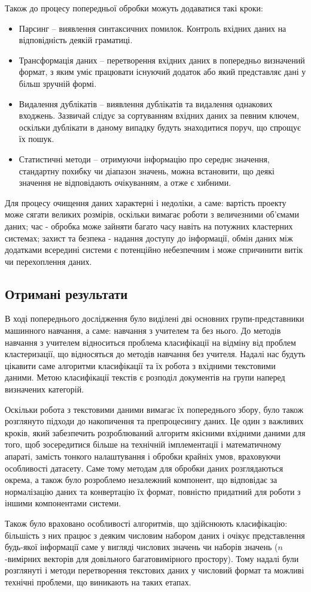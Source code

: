 Також до процесу попередньої обробки можуть додаватися такі кроки:
\begin{itemize}
	\item Парсинг – виявлення синтаксичних помилок. Контроль вхідних даних на відповідність деякій граматиці.
	\item Трансформація даних – перетворення вхідних даних в попередньо визначений формат, з яким уміє працювати існуючий додаток або який представляє дані у більш зручній формі.
	\item Видалення дублікатів – виявлення дублікатів та видалення однакових входжень. Зазвичай слідує за сортуванням вхідних даних за певним ключем, оскільки дублікати в даному випадку будуть знаходитися поруч, що спрощує їх пошук.
	\item Статистичні методи – отримуючи інформацію про середнє значення, стандартну похибку чи діапазон значень, можна встановити, що деякі значення не відповідають очікуванням, а отже є хибними.
\end{itemize}

Для процесу очищення даних характерні і недоліки, а саме: вартість проекту може сягати великих розмірів, оскільки вимагає роботи з величезними об'ємами даних; час - обробка може зайняти багато часу навіть на потужних кластерних системах; захист та безпека - надання доступу до інформації, обмін даних між додатками всередині системи є потенційно небезпечним і може спричинити витік чи перехоплення даних.

\subsection{Отримані результати}
В ході попереднього дослідження було виділені дві основних групи-представники машинного навчання, а саме: навчання з учителем та без нього. До методів навчання з учителем відноситься проблема класифікації на відміну від проблем кластеризації, що відносяться до методів навчання без учителя. Надалі нас будуть цікавити саме алгоритми класифікації та їх робота з вхідними текстовими даними. Метою класифікації текстів є розподіл документів на групи наперед визначених категорій.

Оскільки робота з текстовими даними вимагає їх попереднього збору, було також розглянуто підходи до накопичення та препроцесингу даних. Це один з важливих кроків, який забезпечить розроблюваний алгоритм якісними вхідними даними для того, щоб зосередитися більше на технічній імплементації і математичному апараті, замість тонкого налаштування і обробки крайніх умов, враховуючи особливості датасету. Саме тому методам для обробки даних розглядаються окрема, а також було розроблемо незалежний компонент, що відповідає за нормалізацію даних та конвертацію їх формат, повністю придатний для роботи з іншими компонентами системи.

Також було враховано особливості алгоритмів, що здійснюють класифікацію: більшість з них працює з деяким числовим набором даних і очікує представлення будь-якої інформації саме у вигляді числових значень чи наборів значень ($n$-вимірних векторів для довільного багатовимірного простору). Тому надалі були розглянуті і методи перетворення текстових даних у числовий формат та можливі технічні проблеми, що виникають на таких етапах.
